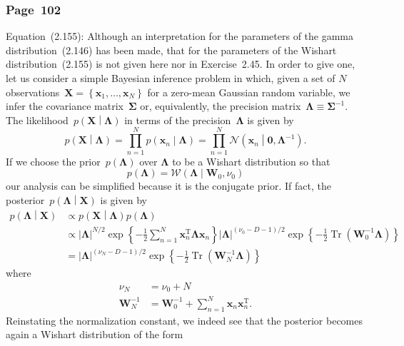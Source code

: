 \documentclass[12pt,a4paper]{article}
\newcommand{\erratum}[1]{\subsubsection*{#1}}
\begin{document}
\erratum{Page~102}
Equation~(2.155):
Although an interpretation for the parameters of the gamma distribution~(2.146) has been made,
that for the parameters of the Wishart distribution~(2.155) is not given here nor in Exercise~2.45.
In order to give one, let us consider a simple Bayesian inference problem in which,
given a set of $N$ observations~$\mathbf{X} =
\left\{ \mathbf{x}_1, \dots, \mathbf{x}_N \right\}$ for a zero-mean Gaussian random variable,
we infer the covariance matrix~$\bm{\Sigma}$ or, equivalently,
the precision matrix~$\bm{\Lambda} \equiv \bm{\Sigma}^{-1}$.
The likelihood~$p\left(\mathbf{X}\middle|\bm{\Lambda}\right)$
in terms of the precision~$\bm{\Lambda}$ is given by
\begin{equation}
p\left(\mathbf{X}\middle|\bm{\Lambda}\right) =
\prod_{n=1}^{N} p\left(\mathbf{x}_n\middle|\bm{\Lambda}\right) =
\prod_{n=1}^{N} \mathcal{N}\left(\mathbf{x}_n\middle|\mathbf{0}, \bm{\Lambda}^{-1}\right) .
\end{equation}
If we choose the prior~$p\left(\bm{\Lambda}\right)$ over $\bm{\Lambda}$ to be
a Wishart distribution so that
\begin{equation}
p\left(\bm{\Lambda}\right) = \mathcal{W}\left(\bm{\Lambda}\middle|\mathbf{W}_0, \nu_0\right)
\label{eq:wishart_prior}
\end{equation}
our analysis can be simplified because it is the conjugate prior.
If fact, the posterior~$p\left(\bm{\Lambda}\middle|\mathbf{X}\right)$ is given by
\begin{align}
p\left(\bm{\Lambda}\middle|\mathbf{X}\right) &\propto
p\left(\mathbf{X}\middle|\bm{\Lambda}\right) p\left(\bm{\Lambda}\right) \\
&\propto \left|\bm{\Lambda}\right|^{N/2}
\exp\left\{-\frac{1}{2}\sum_{n=1}^{N}\mathbf{x}_n^{\operatorname{T}}\bm{\Lambda}\mathbf{x}_n\right\}
\left|\bm{\Lambda}\right|^{(\nu_0 - D - 1)/2}
\exp\left\{-\frac{1}{2}\operatorname{Tr}\left(\mathbf{W}_0^{-1}\bm{\Lambda}\right)\right\} \\
&= \left|\bm{\Lambda}\right|^{(\nu_N - D - 1)/2}
\exp\left\{-\frac{1}{2}\operatorname{Tr}\left(\mathbf{W}_N^{-1}\bm{\Lambda}\right)\right\}
\end{align}
where
\begin{align}
\nu_N &= \nu_0 + N \\
\mathbf{W}_N^{-1} &=
\mathbf{W}_0^{-1} + \sum_{n=1}^{N}\mathbf{x}_n\mathbf{x}_n^{\operatorname{T}} .
\end{align}
Reinstating the normalization constant, we indeed see that the posterior becomes again
a Wishart distribution of the form
\end{document}
